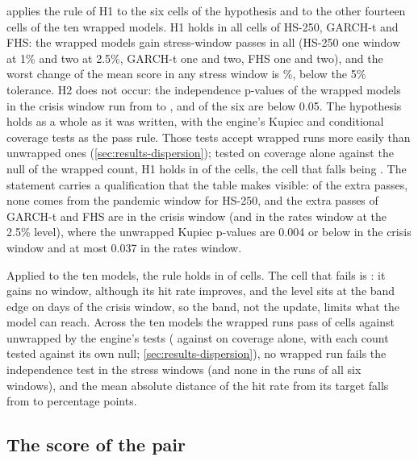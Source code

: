  applies the rule of H1 to the six cells of the hypothesis and to the other fourteen cells of the ten wrapped models. H1 holds in all \hypCells{} cells of HS-250, GARCH-t and FHS: the wrapped models gain \hypExtraTotal{} stress-window passes in all (HS-250 one window at 1\% and two at 2.5\%, GARCH-t one and two, FHS one and two), and the worst change of the mean score in any stress window is \hypWorstFz\%, below the 5\% tolerance. H2 does not occur: the independence p-values of the wrapped models in the crisis window run from \indMin{} to \indMax{}, and \indFails{} of the six are below 0.05. The hypothesis holds as a whole as it was written, with the engine's Kupiec and conditional coverage tests as the pass rule. Those tests accept wrapped runs more easily than unwrapped ones (\cref{sec:results-dispersion}); tested on coverage alone against the null of the wrapped count, H1 holds in \dispCHoneGainCal{} of the \hypCells{} cells, the cell that falls being \dispCHoneLost. The statement carries a qualification that the table makes visible: of the \hypExtraTotal{} extra passes, none comes from the pandemic window for HS-250, and the extra passes of GARCH-t and FHS are in the crisis window (and in the rates window at the 2.5\% level), where the unwrapped Kupiec p-values are 0.004 or below in the crisis window and at most 0.037 in the rates window.

Applied to the ten models, the rule holds in \tenCellsHold{} of \tenCells{} cells. The cell that fails is \tenNoGainCells{}: it gains no window, although its hit rate improves, and the level sits at the band edge on \clipDnRollingOneEqCrisis{} days of the crisis window, so the band, not the update, limits what the model can reach. Across the ten models the wrapped runs pass \tenPassAci{} of \tenRuns{} cells against \tenPassUnw{} unwrapped by the engine's tests (\dispCWrapCal{} against \dispCUnwExact{} on coverage alone, with each count tested against its own null; \cref{sec:results-dispersion}), no wrapped run fails the independence test in the stress windows (and none in the \tenIndRunsAll{} runs of all six windows), and the mean absolute distance of the hit rate from its target falls from \tenHitDevUnw{} to \tenHitDevAci{} percentage points.



\subsection{The score of the pair}
\label{sec:results-score}


